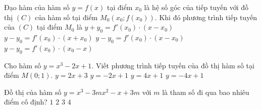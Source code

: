 \begin{ex}%
	Đạo hàm của hàm số $y= f(x)$ tại điểm $x_0$ là hệ số góc của tiếp tuyến với đồ thị $(C)$ của hàm số tại điểm $M_0(x_0; f(x_0) )$. Khi đó phương trình tiếp tuyến của $(C)$ tại điểm $M_0$ là
	\choice
	{$y+y_0=f'(x_0)\cdot (x-x_0)$}
	{$y-y_0=f'(x_0)\cdot (x+x_0)$}
	{\True $y-y_0=f'(x_0)\cdot (x-x_0)$}
	{$y-y_0=f'(x_0)\cdot (x_0-x)$}
	\loigiai{
		
	}
\end{ex}
\begin{ex}%
	Cho hàm số $y= x^3-2x+ 1.$ Viết phương trình tiếp tuyến của đồ thị hàm số tại điểm $M(0;1)$.
	\choice
	{$ y=2x +3$}
	{\True $ y=-2x + 1$}
	{$ y=4x + 1$}
	{$ y=-4x + 1$}
\end{ex}
\begin{ex}%
	Đồ thị của hàm số $y=x^3-3mx^2-x+3m$ với $m$ là tham số đi qua bao nhiêu điểm cố định? 
	\choice
	{$1$}
	{\True $2$}
	{$3$}
	{$4$}
\end{ex}

